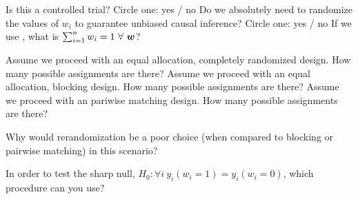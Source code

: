 \documentclass[12pt]{article}
\begin{document}
\begin{enumerate}

 Is this a controlled trial? Circle one: yes / no  
 Do we absolutely need to randomize the values of $w_i$ to guarantee unbiased causal inference? Circle one: yes / no  
 If we use , what is $\sum_{i=1}^n w_i=1~\forall~\boldsymbol{w}$? 

 Assume we proceed with an equal allocation, completely randomized design. How many possible assignments are there? 
 Assume we proceed with an equal allocation, blocking design. How many possible assignments are there? 
 Assume we proceed with an pariwise matching design. How many possible assignments are there? 


 Why would rerandomization be a poor choice  (when compared to blocking or pairwise matching) in this scenario? 

 In order to test the sharp null, $H_0: \forall i ~y_i(w_i=1) = y_i(w_i=0)$, which procedure can you use? 
\end{enumerate}
\end{document}
